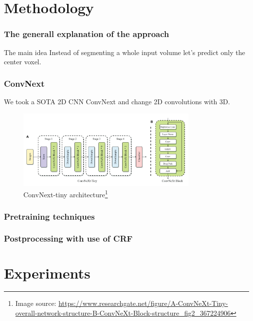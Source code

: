 \documentclass{beamer}
\begin{document}
\section{Methodology}

\begin{frame}
    \frametitle{The generall explanation of the approach}
    \begin{block}{The main idea}
        Instead of segmenting a whole input volume let's predict only the center voxel.
    \end{block}
\end{frame}

\begin{frame}
    \frametitle{ConvNext}
    We took a SOTA 2D CNN ConvNext\cite{liu2022convnet} and change 2D convolutions with 3D.
    \begin{figure}
        \includegraphics[width=0.8\textwidth]{convnext.png}
        \caption{ConvNext-tiny architecture\footnote{Image source: \url{https://www.researchgate.net/figure/A-ConvNeXt-Tiny-overall-network-structure-B-ConvNeXt-Block-structure_fig2_367224906}}}
    \end{figure}
\end{frame}

\begin{frame}
    \frametitle{Pretraining techniques}



\end{frame}

\begin{frame}
    \frametitle{Postprocessing with use of CRF}
\end{frame}

\section{Experiments}
\end{document}
